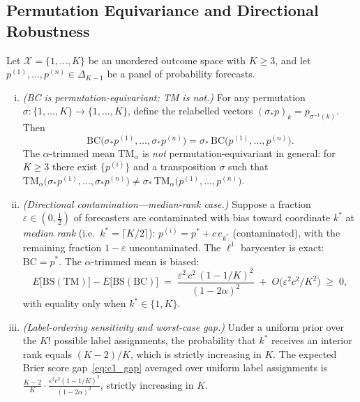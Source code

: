 \subsection*{Permutation Equivariance and Directional Robustness}

\begin{proposition}
\label{prop:c1}
Let $\mathcal{X} = \{1,\ldots,K\}$ be an unordered outcome space with $K\ge 3$, and let
$p^{(1)},\ldots,p^{(n)}\in\Delta_{K-1}$ be a panel of probability forecasts.

\begin{enumerate}[(i)]
\item \textit{(BC is permutation-equivariant; TM is not.)}
For any permutation $\sigma\colon\{1,\ldots,K\}\to\{1,\ldots,K\}$, define the relabelled
vectors $(\sigma_*p)_k = p_{\sigma^{-1}(k)}$.  Then
\[
\mathrm{BC}\!\bigl(\sigma_* p^{(1)},\ldots,\sigma_* p^{(n)}\bigr)
= \sigma_*\,\mathrm{BC}\!\bigl(p^{(1)},\ldots,p^{(n)}\bigr).
\]
The $\alpha$-trimmed mean $\mathrm{TM}_\alpha$ is \emph{not} permutation-equivariant in
general: for $K\ge 3$ there exist $\{p^{(i)}\}$ and a transposition $\sigma$ such that
$\mathrm{TM}_\alpha\!\bigl(\sigma_* p^{(1)},\ldots,\sigma_* p^{(n)}\bigr)
\ne \sigma_*\,\mathrm{TM}_\alpha\!\bigl(p^{(1)},\ldots,p^{(n)}\bigr)$.

\item \textit{(Directional contamination---median-rank case.)}
Suppose a fraction $\varepsilon\in(0,\tfrac{1}{2})$ of forecasters are contaminated with
bias toward coordinate $k^*$ at \emph{median rank} (i.e.\ $k^* = \lceil K/2 \rceil$):
$p^{(i)} = p^* + c\,e_{k^*}$ (contaminated), with the remaining fraction $1-\varepsilon$
uncontaminated.
The $\ell^1$ barycenter is exact: $\mathrm{BC} = p^*$.
The $\alpha$-trimmed mean is biased:
\begin{equation}
E\!\bigl[\mathrm{BS}(\mathrm{TM})\bigr] - E\!\bigl[\mathrm{BS}(\mathrm{BC})\bigr]
\;=\;
\frac{\varepsilon^2\,c^2\,(1-1/K)^2}{(1-2\alpha)^2}
\;+\; O\!\bigl(\varepsilon^2 c^2/K^2\bigr)
\;\ge\; 0,
\label{eq:c1_gap}
\end{equation}
with equality only when $k^*\in\{1,K\}$.

\item \textit{(Label-ordering sensitivity and worst-case gap.)}
Under a uniform prior over the $K!$ possible label assignments, the probability that $k^*$
receives an interior rank equals $(K-2)/K$, which is strictly increasing in $K$.
The expected Brier score gap~\eqref{eq:c1_gap} averaged over uniform label assignments is
$\frac{K-2}{K}\cdot\frac{\varepsilon^2 c^2(1-1/K)^2}{(1-2\alpha)^2}$,
strictly increasing in $K$.
\end{enumerate}
\end{proposition}

